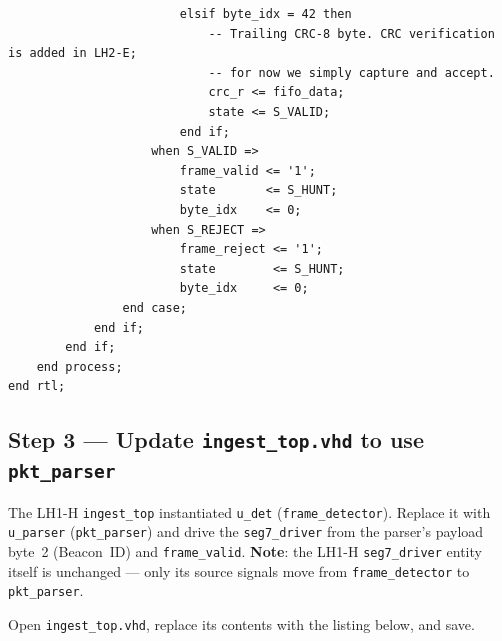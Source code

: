 \documentclass[11pt,letterpaper]{article}
\begin{document}
\begin{lstlisting}
                        elsif byte_idx = 42 then
                            -- Trailing CRC-8 byte. CRC verification is added in LH2-E;
                            -- for now we simply capture and accept.
                            crc_r <= fifo_data;
                            state <= S_VALID;
                        end if;
                    when S_VALID =>
                        frame_valid <= '1';
                        state       <= S_HUNT;
                        byte_idx    <= 0;
                    when S_REJECT =>
                        frame_reject <= '1';
                        state        <= S_HUNT;
                        byte_idx     <= 0;
                end case;
            end if;
        end if;
    end process;
end rtl;
\end{lstlisting}

\subsection{Step 3 --- Update \texttt{ingest\_top.vhd} to use \texttt{pkt\_parser}}

The LH1-H \texttt{ingest\_top} instantiated \texttt{u\_det} (\texttt{frame\_detector}). Replace it with \texttt{u\_parser} (\texttt{pkt\_parser}) and drive the \texttt{seg7\_driver} from the parser's payload byte~2 (Beacon~ID) and \texttt{frame\_valid}. \textbf{Note}: the LH1-H \texttt{seg7\_driver} entity itself is unchanged --- only its source signals move from \texttt{frame\_detector} to \texttt{pkt\_parser}.

Open \texttt{ingest\_top.vhd}, replace its contents with the listing below, and save.
\end{document}
